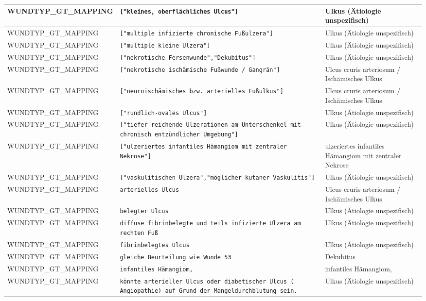 \begin{longtable}{|p{3.5cm}|p{5cm}|p{6.5cm}|}
WUNDTYP\_GT\_MAPPING & \texttt{["kleines, oberflächliches Ulcus"]} & Ulkus (Ätiologie unspezifisch) \\ \hline
WUNDTYP\_GT\_MAPPING & \texttt{["multiple infizierte chronische Fußulzera"]} & Ulkus (Ätiologie unspezifisch) \\ \hline
WUNDTYP\_GT\_MAPPING & \texttt{["multiple kleine Ulzera"]} & Ulkus (Ätiologie unspezifisch) \\ \hline
WUNDTYP\_GT\_MAPPING & \texttt{["nekrotische Fersenwunde","Dekubitus"]} & Ulkus (Ätiologie unspezifisch) \\ \hline
WUNDTYP\_GT\_MAPPING & \texttt{["nekrotische ischämische Fußwunde / Gangrän"]} & Ulcus cruris arteriosum / Ischämisches Ulkus \\ \hline
WUNDTYP\_GT\_MAPPING & \texttt{["neuroischämisches bzw. arterielles Fußulkus"]} & Ulcus cruris arteriosum / Ischämisches Ulkus \\ \hline
WUNDTYP\_GT\_MAPPING & \texttt{["rundlich-ovales Ulcus"]} & Ulkus (Ätiologie unspezifisch) \\ \hline
WUNDTYP\_GT\_MAPPING & \texttt{["tiefer reichende Ulzerationen am Unterschenkel mit chronisch entzündlicher Umgebung"]} & Ulkus (Ätiologie unspezifisch) \\ \hline
WUNDTYP\_GT\_MAPPING & \texttt{["ulzeriertes infantiles Hämangiom mit zentraler Nekrose"]} & ulzeriertes infantiles Hämangiom mit zentraler Nekrose \\ \hline
WUNDTYP\_GT\_MAPPING & \texttt{["vaskulitischen Ulzera","möglicher kutaner Vaskulitis"]} & Ulkus (Ätiologie unspezifisch) \\ \hline
WUNDTYP\_GT\_MAPPING & \texttt{arterielles Ulcus} & Ulcus cruris arteriosum / Ischämisches Ulkus \\ \hline
WUNDTYP\_GT\_MAPPING & \texttt{belegter Ulcus} & Ulkus (Ätiologie unspezifisch) \\ \hline
WUNDTYP\_GT\_MAPPING & \texttt{diffuse fibrinbelegte und teils infizierte Ulzera am rechten Fuß} & Ulkus (Ätiologie unspezifisch) \\ \hline
WUNDTYP\_GT\_MAPPING & \texttt{fibrinbelegtes Ulcus} & Ulkus (Ätiologie unspezifisch) \\ \hline
WUNDTYP\_GT\_MAPPING & \texttt{gleiche Beurteilung wie Wunde 53} & Dekubitus \\ \hline
WUNDTYP\_GT\_MAPPING & \texttt{infantiles Hämangiom,} & infantiles Hämangiom, \\ \hline
WUNDTYP\_GT\_MAPPING & \texttt{könnte arterieller Ulcus oder diabetischer Ulcus ( Angiopathie) auf Grund der Mangeldurchblutung  sein.} & Ulkus (Ätiologie unspezifisch) \\ \hline

\end{longtable}
